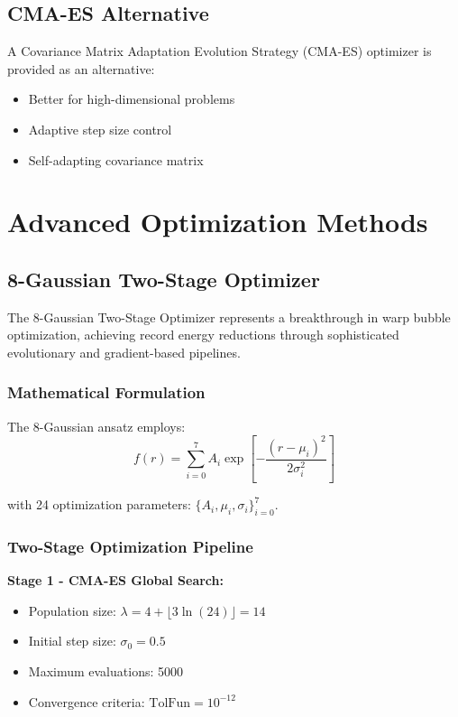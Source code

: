 \documentclass[12pt]{article}
\begin{document}
\subsection{CMA-ES Alternative}

A Covariance Matrix Adaptation Evolution Strategy (CMA-ES) optimizer is provided as an alternative:
\begin{itemize}
\item Better for high-dimensional problems
\item Adaptive step size control
\item Self-adapting covariance matrix
\end{itemize}

\section{Advanced Optimization Methods}

\subsection{8-Gaussian Two-Stage Optimizer}

The 8-Gaussian Two-Stage Optimizer represents a breakthrough in warp bubble optimization, achieving record energy reductions through sophisticated evolutionary and gradient-based pipelines.

\subsubsection{Mathematical Formulation}

The 8-Gaussian ansatz employs:
\[
f(r) = \sum_{i=0}^{7} A_i \exp\left[-\frac{(r-\mu_i)^2}{2\sigma_i^2}\right]
\]

with 24 optimization parameters: $\{A_i, \mu_i, \sigma_i\}_{i=0}^{7}$.

\subsubsection{Two-Stage Optimization Pipeline}

\textbf{Stage 1 - CMA-ES Global Search:}
\begin{itemize}
\item Population size: $\lambda = 4 + \lfloor 3 \ln(24) \rfloor = 14$
\item Initial step size: $\sigma_0 = 0.5$
\item Maximum evaluations: 5000
\item Convergence criteria: $\text{TolFun} = 10^{-12}$
\end{itemize}
\end{document}
